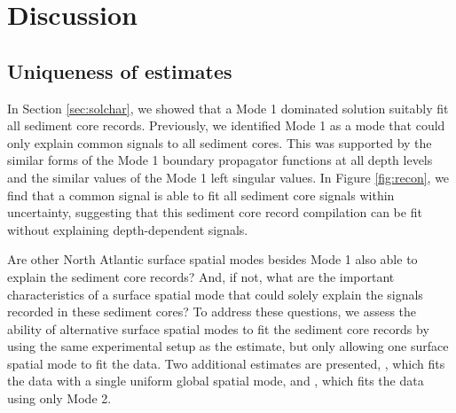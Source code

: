 \documentclass[draft]{agujournal2019}
\begin{document}
\section{Discussion}
\subsection{Uniqueness of estimates}
In Section \ref{sec:solchar}, we showed that a Mode 1 dominated solution suitably
fit all sediment core records. Previously, we identified Mode 1
as a mode that could only
explain common signals to all sediment cores. This was supported by
the similar forms of the Mode 1 boundary propagator functions at all
depth levels and the similar values of the Mode 1 left singular values.
In Figure \ref{fig:recon}, we find that a common signal is
able to fit all sediment core signals within uncertainty, suggesting
that this sediment core record compilation can be fit without
explaining depth-dependent signals.

Are other North Atlantic surface spatial modes besides Mode 1 also able to
explain the sediment core
records? And, if not, what are the important characteristics of a
surface spatial mode that could solely explain the signals recorded in
these sediment cores? To address these questions, we assess the ability
of alternative surface spatial modes to fit the sediment core records
by using the same experimental setup as the  estimate,
but only allowing one surface spatial mode to fit the data. Two
additional estimates are presented, , which fits
the data with a single uniform global spatial mode, and
, which fits the data using only Mode 2.
\end{document}
